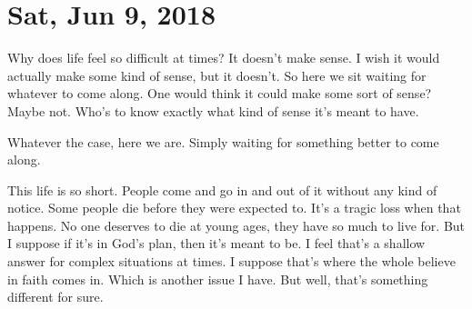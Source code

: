 \section{Sat, Jun 9, 2018}

Why does life feel so difficult at times? It doesn't make sense. I wish it would
actually make some kind of sense, but it doesn't. So here we sit waiting for
whatever to come along. One would think it could make some sort of sense? Maybe
not. Who's to know exactly what kind of sense it's meant to have.

Whatever the case, here we are. Simply waiting for something better to come
along.

This life is so short. People come and go in and out of it without any kind of
notice. Some people die before they were expected to. It's a tragic loss when
that happens. No one deserves to die at young ages, they have so much to live
for. But I suppose if it's in God's plan, then it's meant to be. I feel that's a
shallow answer for complex situations at times. I suppose that's where the whole
believe in faith comes in. Which is another issue I have. But well, that's
something different for sure.
